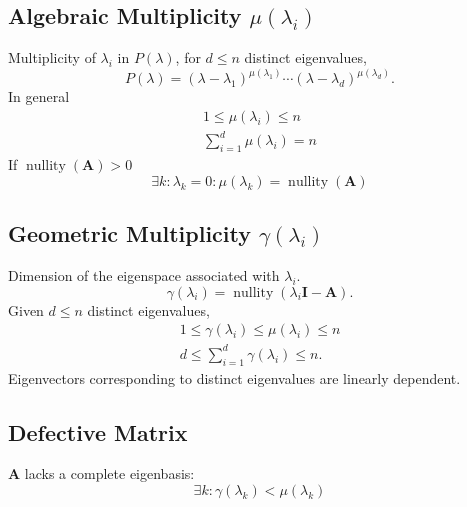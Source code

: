 \documentclass{article}
\DeclareMathOperator*{\nullity}{nullity}
\begin{document}
\begin{multicols*}{3}
    \subsection{Algebraic Multiplicity \texorpdfstring{\(\mu\left( \lambda_i \right)\)}{mu(lambda i)}}
    Multiplicity of \(\lambda_i\) in \(P(\lambda)\),
    for \(d \leq n\) distinct eigenvalues,
    \begin{equation*}
        P\left( \lambda \right) = \left( \lambda - \lambda_1 \right)^{\mu\left( \lambda_1 \right)} \cdots \left( \lambda - \lambda_d \right)^{\mu\left( \lambda_d \right)}.
    \end{equation*}
    In general
    \begin{gather*}
        1 \leq \mu\left( \lambda_i \right) \leq n         \\
        \sum_{i = 1}^d \mu \left( \lambda_i \right) = n
    \end{gather*}
    If \(\nullity{\left( \symbf{A} \right)} > 0\)
    \begin{equation*}
        \exists k : \lambda_k = 0 : \mu\left( \lambda_k \right) = \nullity{\left( \symbf{A} \right)}
    \end{equation*}
    \subsection{Geometric Multiplicity \texorpdfstring{\(\gamma\left( \lambda_i \right)\)}{gamma(lambda i)}}
    Dimension of the eigenspace associated with \(\lambda_i\).
    \begin{equation*}
        \gamma \left( \lambda_i \right) = \nullity{\left( \lambda_i \symbf{I} - \symbf{A} \right)}.
    \end{equation*}
    Given \(d \leq n\) distinct eigenvalues,
    \begin{gather*}
        1 \leq \gamma\left( \lambda_i \right) \leq \mu\left( \lambda_i \right) \leq n \\
        d \leq \sum_{i = 1}^d \gamma \left( \lambda_i \right) \leq n.
    \end{gather*}
    Eigenvectors corresponding to distinct eigenvalues are linearly dependent.
    \subsection{Defective Matrix}
    \(\symbf{A}\) lacks a complete eigenbasis:
    \begin{equation*}
        \exists k : \gamma\left( \lambda_k \right) < \mu\left( \lambda_k \right)
    \end{equation*}

\end{multicols*}
\end{document}
